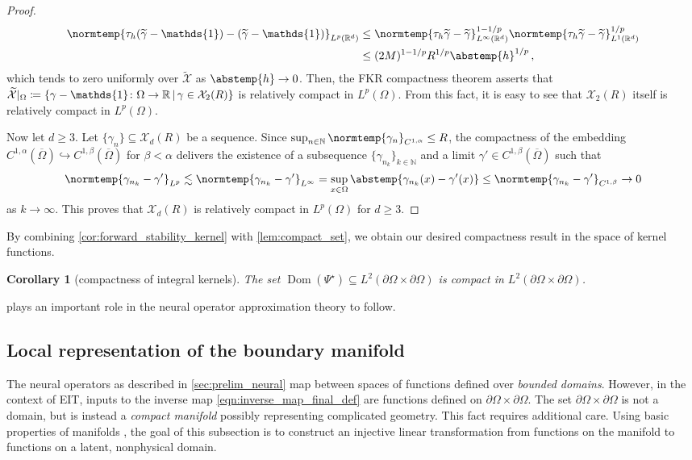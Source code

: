 \documentclass[pdflatex,sn-mathphys-num]{sn-jnl-preprint}
\let\originalleft\left %
\let\originalright\right
\renewcommand{\left}{\mathopen{}\mathclose\bgroup\originalleft}
\renewcommand{\right}{\aftergroup\egroup\originalright}
\newcommand{\N}{\mathbb{N}}
\newcommand{\R}{\mathbb{R}}
\newcommand{\cX}{\mathcal{X}}
\newcommand{\pOmega}{{\partial\Omega}}
\newcommand{\norm}{\normtemp}
\newcommand{\abs}{\abstemp}
\newcommand{\set}[2]{{\left\{ #1 \,\middle|\, #2 \right\}}}
\newcommand{\defeq}{\coloneqq} %
\DeclareMathOperator{\domain}{Dom} %
\newcommand{\onebm}{\mathds{1}} %
\newcommand{\al}{\alpha}
\theoremstyle{thmstyleone}%
\newtheorem{corollary}[theorem]{Corollary}%
\theoremstyle{thmstyletwo}%
\theoremstyle{thmstylethree}%
\numberwithin{equation}{section}
\numberwithin{theorem}{section}
\begin{document}
\begin{proof}
\begin{align*}
    \norm{\tau_h(\widetilde{\gamma}-\onebm) - (\widetilde{\gamma}-\onebm)}_{L^p(\R^d)}&\leq \norm{\tau_h\widetilde{\gamma} - \widetilde{\gamma}}_{L^\infty(\R^d)}^{1-1/p}\norm{\tau_h\widetilde{\gamma} - \widetilde{\gamma}}_{L^1(\R^d)}^{1/p}\\
    &\leq (2 M)^{1-1/p}R^{1/p}\abs{h}^{1/p}\,,
\end{align*}
which tends to zero uniformly over $\widetilde{\cX}$ as $\abs{h}\to0$. Then, the FKR compactness theorem asserts that $\widetilde{\cX}|_{\Omega}\defeq \set{\gamma-\onebm\colon \Omega\to \R}{\gamma\in\cX_2(R)}$ is relatively compact in $L^p(\Omega)$. From this fact, it is easy to see that $\cX_2(R)$ itself is relatively compact in $L^p(\Omega)$.

Now let $d\geq 3$. Let $\{\gamma_n\}\subseteq\cX_d(R)$ be a sequence. Since $\sup_{n\in\N}\norm{\gamma_n}_{C^{1,\al}}\leq R$, the compactness of the embedding $C^{1,\al}(\overline{\Omega})\hookrightarrow C^{1,\beta}(\overline{\Omega})$ for $\beta<\al$ \cite[Thm.~1.34, pp.~11--12]{adams2003sobolev} delivers the existence of a subsequence $\{\gamma_{n_k}\}_{k\in\N}$ and a limit $\gamma'\in C^{1,\beta}(\overline{\Omega})$ such that
\begin{align*}
    \norm{\gamma_{n_k}-\gamma'}_{L^p}\lesssim \norm{\gamma_{n_k}-\gamma'}_{L^\infty}=\sup_{x\in\Omega}\abs{\gamma_{n_k}(x)-\gamma'(x)}\leq \norm{\gamma_{n_k}-\gamma'}_{C^{1,\beta}}\to 0
\end{align*}
as $k\to\infty$. This proves that $\cX_d(R)$ is relatively compact in $L^p(\Omega)$ for $d\geq 3$.
\end{proof}

By combining \cref{cor:forward_stability_kernel} with \cref{lem:compact_set}, we obtain our desired compactness result in the space of kernel functions.
\begin{corollary}[compactness of integral kernels]\label{cor:compact_set_kernel}
    The set $\domain(\Psi^\star)\subseteq L^2(\pOmega\times\pOmega)$ is compact in $L^2(\pOmega\times\pOmega)$.
\end{corollary}
 plays an important role in the neural operator approximation theory to follow.

\subsection{Local representation of the boundary manifold}\label{sec:approx_manifold}
The neural operators as described in \cref{sec:prelim_neural} map between spaces of functions defined over \emph{bounded domains}. However, in the context of EIT, inputs to the inverse map \eqref{eqn:inverse_map_final_def} are functions defined on $\pOmega\times\pOmega$. The set $\pOmega\times\pOmega$ is not a domain, but is instead a \emph{compact manifold} possibly representing complicated geometry. This fact requires additional care. Using basic properties of manifolds \cite{tu2011manifold}, the goal of this subsection is to construct an injective linear transformation from functions on the manifold to functions on a latent, nonphysical domain.
\end{document}
